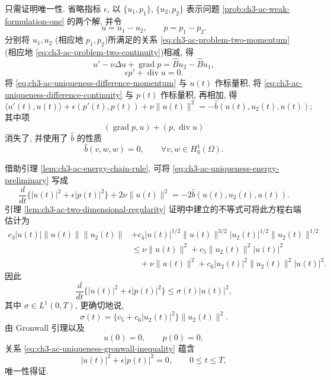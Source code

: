 \begin{Proof}
只需证明唯一性. 省略指标 $\epsilon$, 以 $\{u_1,p_1\}$, $\{u_2,p_2\}$ 表示问题 \ref{prob:ch3-ac-weak-formulation-one} 的两个解, 并令
\[
u=u_1-u_2,
\qquad p=p_1-p_2.
\]
分别将 $u_1,u_2$ (相应地 $p_1,p_2$)所满足的关系 \eqref{eq:ch3-ac-problem-two-momentum} (相应地 \eqref{eq:ch3-ac-problem-two-continuity})相减, 得
\begin{equation}
u'-\nu\Delta u+\operatorname{grad}p
=\widehat B u_2-\widehat B u_1,
\label{eq:ch3-ac-uniqueness-difference-momentum}
\end{equation}
\begin{equation}
\epsilon p'+\operatorname{div}u=0.
\label{eq:ch3-ac-uniqueness-difference-continuity}
\end{equation}
将 \eqref{eq:ch3-ac-uniqueness-difference-momentum} 与 $u(t)$ 作标量积, 将 \eqref{eq:ch3-ac-uniqueness-difference-continuity} 与 $p(t)$ 作标量积, 再相加, 得
\begin{equation}
\langle u'(t),u(t)\rangle
+\epsilon(p'(t),p(t))+\nu\lVert u(t)\rVert^2
=-\widehat b(u(t),u_2(t),u(t));
\label{eq:ch3-ac-uniqueness-energy-preliminary}
\end{equation}
其中项
\[
(\operatorname{grad}p,u)+(p,\operatorname{div}u)
\]
消失了, 并使用了 $\widehat b$ 的性质
\[
\widehat b(v,w,w)=0,
\qquad\forall v,w\in H_0^1(\Omega).
\]

\hypertarget{chapter-03-page-312}{}
借助引理 \ref{lem:ch3-ac-energy-chain-rule}, 可将 \eqref{eq:ch3-ac-uniqueness-energy-preliminary} 写成
\[
\frac d{dt}\{|u(t)|^2+\epsilon|p(t)|^2\}
+2\nu\lVert u(t)\rVert^2
=-2\widehat b(u(t),u_2(t),u(t)).
\]
引理 \ref{lem:ch3-ac-two-dimensional-regularity} 证明中建立的不等式可将此方程右端估计为
\[
\begin{aligned}
c_3|u(t)|\lVert u(t)\rVert\lVert u_2(t)\rVert
&+c_4|u(t)|^{1/2}\lVert u(t)\rVert^{3/2}
|u_2(t)|^{1/2}\lVert u_2(t)\rVert^{1/2}\\
&\leq\nu\lVert u(t)\rVert^2
+c_5\lVert u_2(t)\rVert^2|u(t)|^2\\
&\quad+\nu\lVert u(t)\rVert^2
+c_6|u_2(t)|^2\lVert u_2(t)\rVert^2|u(t)|^2.
\end{aligned}
\]
因此
\begin{equation}
\frac d{dt}\{|u(t)|^2+\epsilon|p(t)|^2\}
\leq\sigma(t)|u(t)|^2,
\label{eq:ch3-ac-uniqueness-gronwall-inequality}
\end{equation}
其中 $\sigma\in L^1(0,T)$, 更确切地说,
\[
\sigma(t)=\{c_5+c_6|u_2(t)|^2\}\lVert u_2(t)\rVert^2.
\]
由 Gronwall 引理以及
\[
u(0)=0,
\qquad p(0)=0,
\]
关系 \eqref{eq:ch3-ac-uniqueness-gronwall-inequality} 蕴含
\[
|u(t)|^2+\epsilon|p(t)|^2=0,
\qquad0\leq t\leq T,
\]
唯一性得证.
\end{Proof}

